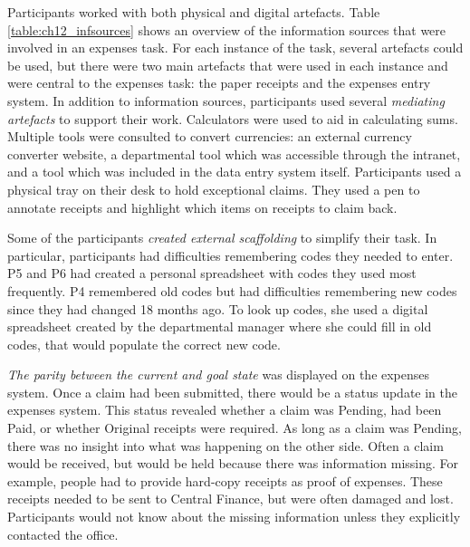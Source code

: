 
Participants worked with both physical and digital artefacts. Table \ref{table:ch12_infsources} shows an overview of the information sources that were involved in an expenses task. For each instance of the task, several artefacts could be used, but there were two main artefacts that were used in each instance and were central to the expenses task: the paper receipts and the expenses entry system.
In addition to information sources, participants used several \textit{mediating artefacts} to support their work. Calculators were used to aid in calculating sums. Multiple tools were consulted to convert currencies: an external currency converter website, a departmental tool which was accessible through the intranet, and a tool which was included in the data entry system itself. Participants used a physical tray on their desk to hold exceptional claims. They used a pen to annotate receipts and highlight which items on receipts to claim back.

Some of the participants \textit{created external scaffolding} to simplify their task. In particular, participants had difficulties remembering codes they needed to enter. P5 and P6 had created a personal spreadsheet with codes they used most frequently. P4 remembered old codes but had difficulties remembering new codes since they had changed 18 months ago. To look up codes, she used a digital spreadsheet created by the departmental manager where she could fill in old codes, that would populate the correct new code. 

\textit{The parity between the current and goal state} was displayed on the expenses system. Once a claim had been submitted, there would be a status update in the expenses system. This status revealed whether a claim was Pending, had been Paid, or whether Original receipts were required. As long as a claim was Pending, there was no insight into what was happening on the other side. Often a claim would be received, but would be held because there was information missing. For example, people had to provide hard-copy receipts as proof of expenses. These receipts needed to be sent to Central Finance, but were often damaged and lost. Participants would not know about the missing information unless they explicitly contacted the office.

